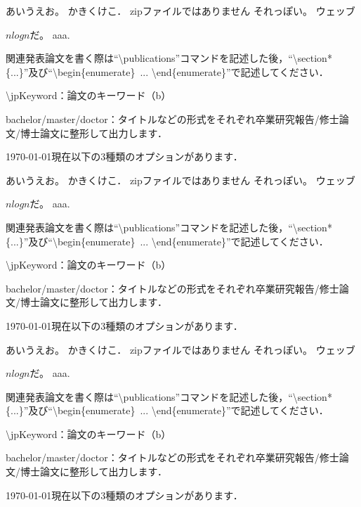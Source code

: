 
あいうえお。
かきくけこ．
zipファイルではありません
それっぽい。
ウェッブ

$n log n$だ。
aaa.\cite{bbb:123}

関連発表論文を書く際は``\textbackslash publications''コマンドを記述した後，``\textbackslash section*\{...\}''及び``\textbackslash begin\{enumerate\}\ ... \textbackslash end\{enumerate\}''で記述してください．

\item \textbackslash jpKeyword：論文のキーワード（b）

\item bachelor/master/doctor：タイトルなどの形式をそれぞれ卒業研究報告/修士論文/博士論文に整形して出力します．

\today 現在以下の3種類のオプションがあります．


あいうえお。
かきくけこ．
zipファイルではありません
それっぽい。
ウェッブ

$n log n$だ。
aaa.\cite{bbb:123}

関連発表論文を書く際は``\textbackslash publications''コマンドを記述した後，``\textbackslash section*\{...\}''及び``\textbackslash begin\{enumerate\}\ ... \textbackslash end\{enumerate\}''で記述してください．

\item \textbackslash jpKeyword：論文のキーワード（b）

\item bachelor/master/doctor：タイトルなどの形式をそれぞれ卒業研究報告/修士論文/博士論文に整形して出力します．

\today 現在以下の3種類のオプションがあります．


あいうえお。
かきくけこ．
zipファイルではありません
それっぽい。
ウェッブ

$n log n$だ。
aaa.\cite{bbb:123}

関連発表論文を書く際は``\textbackslash publications''コマンドを記述した後，``\textbackslash section*\{...\}''及び``\textbackslash begin\{enumerate\}\ ... \textbackslash end\{enumerate\}''で記述してください．

\item \textbackslash jpKeyword：論文のキーワード（b）

\item bachelor/master/doctor：タイトルなどの形式をそれぞれ卒業研究報告/修士論文/博士論文に整形して出力します．

\today 現在以下の3種類のオプションがあります．
